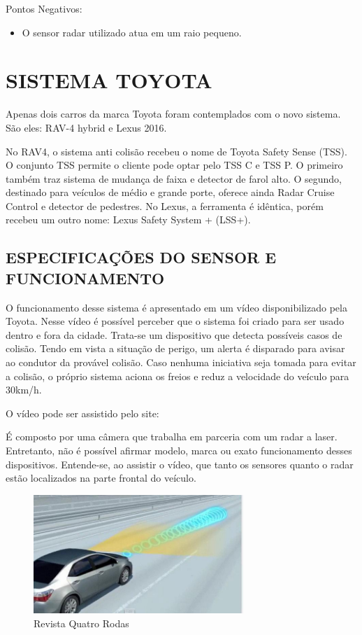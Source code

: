   Pontos Negativos:
 \begin{itemize}
   \item O sensor radar utilizado atua em um raio pequeno.
 \end{itemize}

 \section{SISTEMA TOYOTA}

 Apenas dois carros da marca Toyota foram contemplados com o novo sistema.
 São eles: RAV-4 hybrid e Lexus 2016. \cite{3comper}

 No RAV4, o sistema anti colisão recebeu o nome de Toyota Safety Sense
 (TSS). O conjunto TSS permite o cliente pode optar pelo TSS C e TSS P. O
 primeiro também traz sistema de mudança de faixa e detector de farol alto.
  O segundo, destinado para veículos de médio e grande porte, oferece ainda
  Radar Cruise Control e detector de pedestres. No Lexus, a ferramenta é
  idêntica, porém recebeu um outro nome: Lexus Safety System + (LSS+).

  \subsection{ESPECIFICAÇÕES DO SENSOR E FUNCIONAMENTO}

  O funcionamento desse sistema é apresentado em um vídeo disponibilizado pela
  Toyota. Nesse vídeo é possível perceber que o sistema foi criado para ser usado
  dentro e fora da cidade. Trata-se um dispositivo que detecta possíveis casos de
  colisão. Tendo em vista a situação de perigo, um alerta é disparado para avisar
  ao condutor da provável colisão. Caso nenhuma iniciativa seja tomada para evitar
  a colisão, o próprio sistema aciona os freios e reduz a velocidade do veículo para 30km/h.

  O vídeo pode ser assistido pelo site: \cite{4comper}

  É composto por uma câmera que trabalha em parceria com um radar a laser.
  Entretanto, não é possível afirmar modelo, marca ou exato funcionamento
  desses dispositivos. Entende-se, ao assistir o vídeo, que tanto os sensores
  quanto o radar estão localizados na parte frontal do veículo.


  \begin{figure}[h]
    \centering
    \includegraphics[width=300px, scale=1]{figuras/sinal_componentes}
    \caption{Revista Quatro Rodas}
  \label{fig:sinal_componentes}
  \end{figure}

